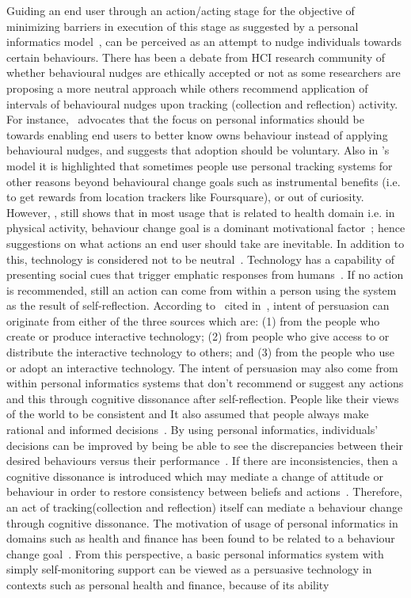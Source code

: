 Guiding an end user through an action/acting stage for the objective of minimizing barriers in execution of this stage as suggested by a personal informatics model~\citep{li2010stage}, can be perceived as an attempt to nudge individuals towards certain behaviours. There has been a debate from HCI research community of whether behavioural nudges are ethically accepted or not as some researchers are proposing a more neutral approach while others recommend application of intervals of behavioural nudges upon tracking (collection and reflection) activity.  For instance,~\cite{munson2012mindfulness} advocates that the focus on personal informatics  should be towards enabling end users to better know owns behaviour instead of applying behavioural nudges, and suggests that adoption should be voluntary. Also in \cite{epstein2015lived}'s model it is highlighted that sometimes people use personal tracking systems for other reasons beyond behavioural change goals such as instrumental benefits (i.e. to get rewards from location trackers like Foursquare), or out of curiosity. However, \cite{epstein2015lived}, still  shows that in most usage that is related to health domain i.e. in physical activity, behaviour change goal is a dominant motivational factor~\citep{epstein2015lived}; hence suggestions on what actions an end user should take are inevitable. In addition to this, technology is considered not to be neutral~\citep{Oinas-kukkonen:psd}. Technology has a capability of presenting social cues that trigger emphatic responses from humans~\citep{foggpersuasivebook}. If no action is recommended, still an action can come from within a person using the system as the result of self-reflection. According to~\cite{fogg1998persuasive} cited in~\cite{Oinas-kukkonen:psd}, intent of persuasion can originate from either of the three sources which are: (1) from the people who create or produce interactive technology; (2) from people who give access to or distribute the interactive technology to others; and (3) from the people who use or adopt an interactive technology. The intent of persuasion may also come from within personal informatics systems that don't recommend or suggest any actions and this through cognitive dissonance after self-reflection. People like their views of the world to be consistent and It also assumed that people always make rational and informed decisions~\citep{Oinas-kukkonen:psd}. By using personal informatics, individuals' decisions can be improved by being be able to see the discrepancies between their desired behaviours versus their performance~\citep{comber2013designing}. If there are inconsistencies, then a cognitive dissonance is introduced which may mediate a change of attitude or behaviour in order to restore consistency between beliefs and actions~\citep{Oinas-kukkonen:psd}. Therefore, an act of tracking(collection and reflection) itself can mediate a behaviour change through cognitive dissonance. The motivation of usage of personal informatics in domains such as health and finance has been found to be related to a behaviour change goal~\citep{epstein2015lived}. From this perspective, a basic personal informatics system with simply self-monitoring support can be viewed as a persuasive technology in contexts such as personal health and finance, because of its ability 